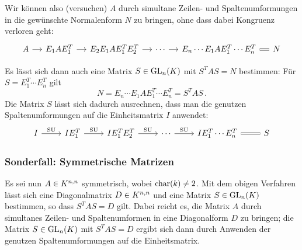 Wir können also (versuchen) $A$ durch simultane Zeilen- und Spaltenumformungen in die gewünschte Normalenform $N$ zu bringen, ohne dass dabei Kongruenz verloren geht:
\[
  \begin{tikzcd}[column sep = small]
      A
      \arrow{r}
    & E_1 A E_1^T
      \arrow{r}
    & E_2 E_1 A E_1^T E_2^T
      \arrow{r}
    & \cdots
      \arrow{r}
    & E_n \dotsm E_1 A E_1^T \dotsm E_n^T
      \arrow[equal]{r}
    & N
  \end{tikzcd}
\]

Es lässt sich dann auch eine Matrix $S \in \GL{n}{K}$ mit $S^T A S = N$ bestimmen:
Für $S = E_1^T \dotsm E_n^T$ gilt
\[
    N
  = E_n \dotsm E_1 A E_1^T \dotsm E_n^T
  = S^T A S \,. 
\]
Die Matrix $S$ lässt sich dadurch ausrechnen, dass man die genutzen Spaltenumformungen auf die Einheitsmatrix $I$ anwendet:
\[
  \begin{tikzcd}
      I
      \arrow{r}[above]{\text{SU}}
    & I E_1^T
      \arrow{r}[above]{\text{SU}}
    & I E_1^T E_2^T
      \arrow{r}[above]{\text{SU}}
    & \cdots
      \arrow{r}[above]{\text{SU}}
    & I E_1^T \dotsm E_n^T
      \arrow[equal]{r}
    & S
  \end{tikzcd}
\]



\subsubsection{Sonderfall: Symmetrische Matrizen}

Es sei nun $A \in \matrices{n}{K}$ symmetrisch, wobei $\ringchar(k) \neq 2$.
Mit dem obigen Verfahren lässt sich eine Diagonalmatrix $D \in \matrices{n}{K}$ und eine Matrix $S \in \GL{n}{K}$ bestimmen, so dass $S^T A S = D$ gilt.
Dabei reicht es, die Matrix $A$ durch simultanes Zeilen- und Spaltenumformen in eine Diagonalform $D$ zu bringen;
die Matrix $S \in \GL{n}{K}$ mit $S^T A S = D$ ergibt sich dann durch Anwenden der genutzen Spaltenumformungen auf die Einheitsmatrix.

